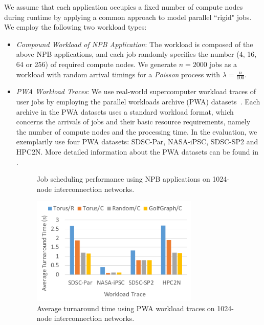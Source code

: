 \documentclass[conference]{IEEEtran}
\begin{document}
We assume that each application occupies a fixed number of compute nodes during runtime by applying a common approach to model parallel ``rigid" jobs.
We employ the following two workload types:
\begin{itemize}
\item 
\emph{Compound Workload of NPB Application}: 
The workload is composed of the above NPB applications, and each job randomly specifies the number (4, 16, 64 or 256) of required compute nodes.
We generate $n = 2000$ jobs as a workload with random arrival timings for a \emph{Poisson} process with $\lambda = \frac{n}{100}$. 
\item 
\emph{PWA Workload Traces}: 
We use real-world supercomputer workload traces of user jobs by employing the parallel workloads archive (PWA) datasets~\cite{PWA}. 
Each archive in the PWA datasets uses a standard workload format, which concerns the arrivals of jobs and their basic resource requirements, namely the number of compute nodes and the processing time. 
In the evaluation, we exemplarily use four PWA datasets: SDSC-Par, NASA-iPSC, SDSC-SP2 and HPC2N.
More detailed information about the PWA datasets can be found in \cite{pwa2014}.

\begin{figure}[tb]
	\centering
	\caption{Job scheduling performance using NPB applications on 1024-node interconnection networks.}
	\label{fig:npb} 
\end{figure}

\begin{figure}[tb]
	\centering
	\includegraphics[width=8cm]{ps/pwa-time.pdf}
	\caption{Average turnaround time using PWA workload traces on 1024-node interconnection networks.}
	\label{fig:pwa-time}
\end{figure}


\end{itemize}
\end{document}

